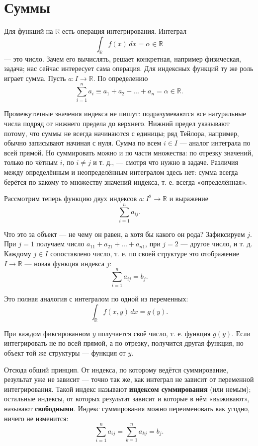 \documentclass[11pt,a4paper]{article}
\begin{document}
\section{Суммы}

Для функций на $\mathbb{R}$ есть операция интегрирования. Интеграл
\[
\int_{\mathbb{R}} f(x)\, dx = \alpha \in \mathbb{R}
\]
— это число. Зачем его вычислять, решает конкретная, например физическая, задача; нас сейчас интересует сама операция. Для индексных функций ту же роль играет сумма. Пусть $a\colon I \to \mathbb{R}$. По определению
\[
\sum_{i=1}^{n} a_i \equiv a_1 + a_2 + \dots + a_n = \alpha \in \mathbb{R}.
\]

Промежуточные значения индекса не пишут: подразумеваются все натуральные числа подряд от нижнего предела до верхнего. Нижний предел указывают потому, что суммы не всегда начинаются с единицы; ряд Тейлора, например, обычно записывают начиная с нуля. Сумма по всем $i \in I$ — аналог интеграла по всей прямой. Но суммировать можно и по части множества: по отрезку значений, только по чётным $i$, по $i \neq j$ и т. д., — смотря что нужно в задаче. Различия между определённым и неопределённым интегралом здесь нет: сумма всегда берётся по какому-то множеству значений индекса, т. е. всегда «определённая».

Рассмотрим теперь функцию двух индексов $a\colon I^2 \to \mathbb{R}$ и выражение
\[
\sum_{i=1}^{n} a_{ij}.
\]

Что это за объект — не чему он равен, а хотя бы какого он рода? Зафиксируем $j$. При $j = 1$ получаем число $a_{11} + a_{21} + \dots + a_{n1}$, при $j = 2$ — другое число, и т. д. Каждому $j \in I$ сопоставлено число, т. е. по своей структуре это отображение $I \to \mathbb{R}$ — новая функция индекса $j$:
\[
\sum_{i=1}^{n} a_{ij} = b_j.
\]

Это полная аналогия с интегралом по одной из переменных:
\[
\int_{\mathbb{R}} f(x, y)\, dx = g(y).
\]

При каждом фиксированном $y$ получается своё число, т. е. функция $g(y)$. Если интегрировать не по всей прямой, а по отрезку, получится другая функция, но объект той же структуры — функция от $y$.

Отсюда общий принцип. От индекса, по которому ведётся суммирование, результат уже не зависит — точно так же, как интеграл не зависит от переменной интегрирования. Такой индекс называют \textbf{индексом суммирования} (или немым); остальные индексы, от которых результат зависит и которые в нём «выживают», называют \textbf{свободными}. Индекс суммирования можно переименовать как угодно, ничего не изменится:
\[
\sum_{i=1}^{n} a_{ij} = \sum_{k=1}^{n} a_{kj} = b_j.
\]
\end{document}
